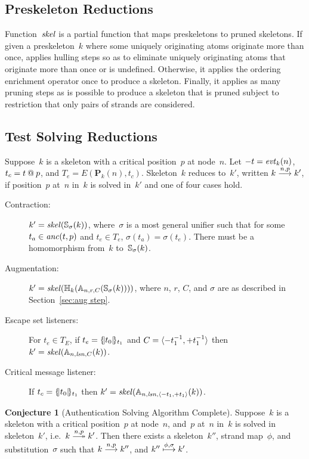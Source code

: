 \documentclass[12pt]{article}
\theoremstyle{definition}
\newtheorem{conj}{Conjecture}[section]
\newcommand{\solve}[1]{\stackrel{#1}{\longtwoheadrightarrow}}
\newcommand{\pubmsg}{\mathbf{P}}
\newcommand{\anc}{\fn{anc}}
\newcommand{\evt}{\fn{evt}}
\newcommand{\lsn}{\fn{lsn}}
\begin{document}
\subsection{Preskeleton Reductions}

Function~$\operatorname{\mathit{skel}}$ is a partial function that maps preskeletons to
pruned skeletons.  If given a preskeleton~$k$ where some uniquely
originating atoms originate more than once,  applies hulling
steps so as to eliminate uniquely originating atoms that originate
more than once or is undefined.  Otherwise, it applies the ordering
enrichment operator once to produce a skeleton.  Finally, it applies
as many pruning steps as is possible to produce a skeleton that is
pruned subject to restriction that only pairs of strands are
considered.

\subsection{Test Solving Reductions}

Suppose~$k$ is a skeleton with a critical position~$p$ at node~$n$.
Let $\inbnd t=\evt_k(n)$, $t_c=t\mathbin{@} p$, and $T_e=E(\pubmsg_k(n),
t_c)$.  Skeleton~$k$ reduces to~$k'$, written $k\stackrel{n,p}{\longrightarrow}k'$, if
position~$p$ at~$n$ in~$k$ is solved in~$k'$ and one of four cases
hold.

\begin{description}
\item[Contraction:] $k'=\operatorname{\mathit{skel}}(\mathbb S_\sigma(k))$, where~$\sigma$
  is a most general unifier such that for some $t_a\in\anc(t, p)$ and
  $t_e\in T_e$, $\sigma(t_a)=\sigma(t_e)$.  There must be a
  homomorphism from~$k$ to~$\mathbb S_\sigma(k)$.

\item[Augmentation:] $k'=\operatorname{\mathit{skel}}(\mathbb H_k(\mathbb A_{n, r,
  C}(\mathbb S_\sigma(k))))$, where $n$, $r$, $C$, and $\sigma$ are as
  described in Section~\ref{sec:aug step}.

\item[Escape set listeners:] For $t_e\in T_E$, if $t_e=\{\!|t_0|\!\}_{t_1}$
  and $C=\langle\mathord - t_1^{-1},\mathord + t_1^{-1}\rangle$ then
  $k'=\fn{skel}(\ops{A}_{n, \lsn,C}(k))$.
\item[Critical message listener:] If $t_c=\{\!|t_0|\!\}_{t_1}$ then
  $k'=\fn{skel}(\ops{A}_{n, \lsn,\seq{\inbnd t_1,\outbnd t_1}}(k))$.
\end{description}

\begin{conj}[Authentication Solving Algorithm Complete]
Suppose~$k$ is a skeleton with a critical position~$p$ at node~$n$,
and~$p$ at~$n$ in~$k$ is solved in skeleton~$k'$, i.e.\ $k\solve{n,p}k'$.
Then there exists a skeleton~$k''$, strand map~$\phi$, and
substitution~$\sigma$ such that $k\stackrel{n,p}{\longrightarrow}k''$, and
$k''\stackrel{\phi,\sigma}{\longmapsto}k'$.
\end{conj}
\end{document}
